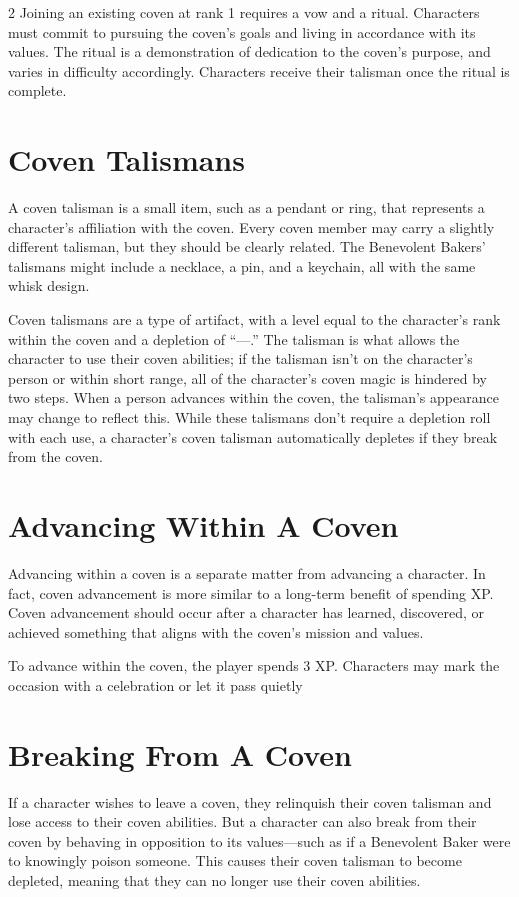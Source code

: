 \begin{multicols}{2}
Joining an existing coven at rank 1 requires a vow and a ritual. Characters must commit to pursuing the coven’s goals and living in accordance with its values. The ritual is a demonstration of dedication to the coven’s purpose, and varies in difficulty accordingly. Characters receive their talisman once the ritual is complete. 

\section{Coven Talismans}

A coven talisman is a small item, such as a pendant or ring, that represents a character’s affiliation with the coven. Every coven member may carry a slightly different talisman, but they should be clearly related. The Benevolent Bakers’ talismans might include a necklace, a pin, and a keychain, all with the same whisk design. 

Coven talismans are a type of artifact, with a level equal to the character’s rank within the coven and a depletion of “—.” The talisman is what allows the character to use their coven abilities; if the talisman isn’t on the character’s person or within short range, all of the character’s coven magic is hindered by two steps. When a person advances within the coven, the talisman’s appearance may change to reflect this. While these talismans don’t require a depletion roll with each use, a character’s coven talisman automatically depletes if they break from the coven.

\section{Advancing Within A Coven}

Advancing within a coven is a separate matter from advancing a character. In fact, coven advancement is more similar to a long-term benefit of spending XP. Coven advancement should occur after a character has learned, discovered, or achieved something that aligns with the coven’s mission and values. 

To advance within the coven, the player spends 3 XP. Characters may mark the occasion with a celebration or let it pass quietly

\section{Breaking From A Coven}

If a character wishes to leave a coven, they relinquish their coven talisman and lose access to their coven abilities. But a character can also break from their coven by behaving in opposition to its values—such as if a Benevolent Baker were to knowingly poison someone. This causes their coven talisman to become depleted, meaning that they can no longer use their coven abilities. 


\end{multicols}
